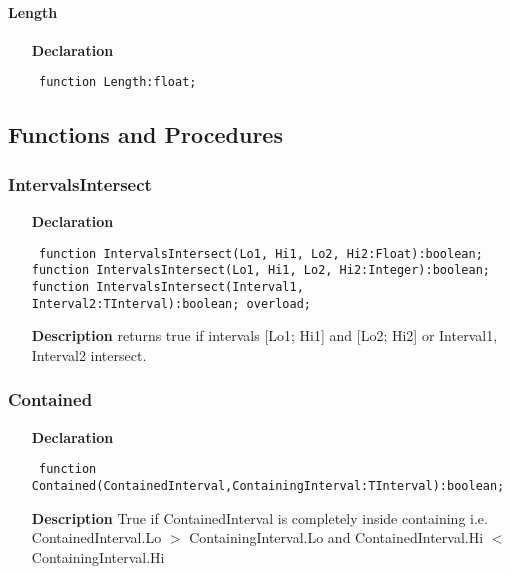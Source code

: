 \documentclass[12pt,a4paper,oneside]{report}
\newcommand{\declarationitem}[1]{\textbf{#1}}
\newcommand{\descriptiontitle}[1]{\textbf{#1}}
\newcommand{\code}[1]{\texttt{#1}}
\begin{document}
\paragraph{Length}\hspace*{\fill}

\label{uIntervals.TInterval-Length}
\begin{itemize}\item[\declarationitem{Declaration}\hfill]
\begin{flushleft}
\code{
function Length:float;}

\end{flushleft}

\end{itemize}
\subsection{Functions and Procedures}
\subsubsection{IntervalsIntersect}
\label{uIntervals-IntervalsIntersect}
\begin{itemize}\item[\declarationitem{Declaration}\hfill]
\begin{flushleft}
\code{
function IntervalsIntersect(Lo1, Hi1, Lo2, Hi2:Float):boolean;\\
function IntervalsIntersect(Lo1, Hi1, Lo2, Hi2:Integer):boolean;\\
function IntervalsIntersect(Interval1, Interval2:TInterval):boolean; overload;}
\end{flushleft}
\item[\descriptiontitle{Description}]
returns true if intervals [Lo1; Hi1] and [Lo2; Hi2] or Interval1, Interval2 intersect.
\end{itemize}
\subsubsection{Contained}
\label{uIntervals-Contained}
\begin{itemize}\item[\declarationitem{Declaration}\hfill]
\begin{flushleft}
\code{
function Contained(ContainedInterval,ContainingInterval:TInterval):boolean;}
\end{flushleft}
\item[\descriptiontitle{Description}]
True if ContainedInterval is completely inside containing i.e. ContainedInterval.Lo {$>$} ContainingInterval.Lo and ContainedInterval.Hi {$<$} ContainingInterval.Hi

\end{itemize}
\end{document}
